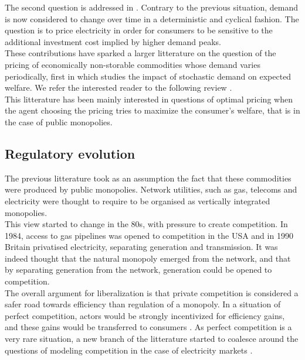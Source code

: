 The second question is addressed in \cite{boiteux1960peak}. Contrary to the previous situation, demand is now considered to change over time in a deterministic and cyclical fashion. The question is to price electricity in order for consumers to be sensitive to the additional investment cost implied by higher demand peaks. \\

These contributions have sparked a larger litterature on the question of the pricing of economically non-storable commodities whose demand varies periodically, first in \cite{brown1969public} which studies the impact of stochastic demand on expected welfare. We refer the interested reader to the following review \cite{crew1995theory}. \\ 

This litterature has been mainly interested in questions of optimal pricing when the agent choosing the pricing tries to maximize the consumer's welfare, that is in the case of public monopolies. \\

\subsection*{Regulatory evolution}
The previous litterature took as an assumption the fact that these commodities were produced by public monopolies. Network utilities, such as gas, telecoms and electricity were thought to require to be organised as vertically integrated monopolies. \\

This view started to change in the 80s, with pressure to create competition. In 1984, access to gas pipelines was opened to competition in the USA and in 1990 Britain privatised electricity, separating generation and transmission. It was indeed thought that the natural monopoly emerged from the network, and that by separating generation from the network, generation could be opened to competition. \\

The overall argument for liberalization is that private competition is considered a safer road towards efficiency than regulation of a monopoly. In a situation of perfect competition, actors would be strongly incentivized for efficiency gains, and these gains would be transferred to consumers \cite{schmidt1996costs}. As perfect competition is a very rare situation, a new branch of the litterature started to coalesce around the questions of modeling competition in the case of electricity markets \cite{newbery1997privatisation}. \\

